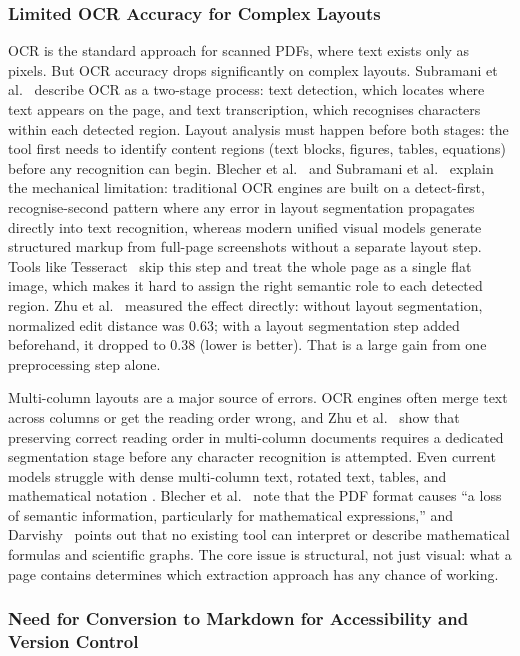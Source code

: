 \documentclass[12pt]{article}
\begin{document}
\subsubsection{Limited OCR Accuracy for Complex Layouts}

OCR is the standard approach for scanned PDFs, where text exists only as
pixels. But OCR accuracy drops significantly on complex layouts. Subramani
et al.\ \cite{subramani2020} describe OCR as a two-stage process: text
detection, which locates where text appears on the page, and text
transcription, which recognises characters within each detected region.
Layout analysis must happen before both stages: the tool first needs to
identify content regions (text blocks, figures, tables, equations) before
any recognition can begin. Blecher et al.\ \cite{blecher2023} and Subramani
et al.\ \cite{subramani2020} explain the mechanical limitation: traditional
OCR engines are built on a detect-first, recognise-second pattern where any
error in layout segmentation propagates directly into text recognition,
whereas modern unified visual models generate structured markup from full-page
screenshots without a separate layout step. Tools like
Tesseract~\cite{smith2007} skip this step and treat the whole page as a
single flat image, which makes it hard to assign the right semantic role to
each detected region. Zhu et al.\ \cite{zhu2022} measured the effect
directly: without layout segmentation, normalized edit distance was 0.63;
with a layout segmentation step added beforehand, it dropped to 0.38 (lower
is better). That is a large gain from one preprocessing step alone.

Multi-column layouts are a major source of errors. OCR engines often merge
text across columns or get the reading order wrong, and Zhu et
al.\ \cite{zhu2022} show that preserving correct reading order in
multi-column documents requires a dedicated segmentation stage before any
character recognition is attempted. Even current models struggle with dense
multi-column text, rotated text, tables, and mathematical notation
\cite{subramani2020, meuschke2023}. Blecher et al.\ \cite{blecher2023}
note that the PDF format causes ``a loss of semantic information,
particularly for mathematical expressions,'' and Darvishy~\cite{darvishy2018}
points out that no existing tool can interpret or describe mathematical
formulas and scientific graphs. The core issue is structural, not just
visual: what a page contains determines which extraction approach has any
chance of working.

\subsubsection{Need for Conversion to Markdown for Accessibility and Version Control}
\end{document}
